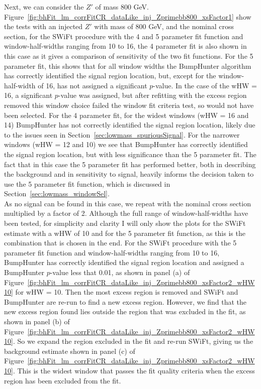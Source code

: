 Next, we can consider the $Z'$ of mass 800 GeV.
Figure~\ref{fig:bhFit_lm_corrFitCR_dataLike_inj_Zprimebb800_xsFactor1} show the tests with an injected $Z'$ with mass of 800 GeV, and the nominal cross section,
for the SWiFt procedure with the 4 and 5 parameter fit function and window-half-widths ranging from 10 to 16,
the 4 parameter fit is also shown in this case as it gives a comparison of sensitivity of the two fit functions.
For the 5 parameter fit, this shows that for all window widths the {\sc BumpHunter} algorithm has correctly identified the signal region location,
but, except for the window-half-width of 16, has not assigned a significant $p$-value.
In the case of the wHW = 16, a significant $p$-value was assigned,
but after refitting with the excess region removed this window choice failed the window fit criteria test, so would not have been selected.
For the 4 parameter fit, for the widest windows (wHW = 16 and 14) {\sc BumpHunter} has not correctly identified the signal region location,
likely due to the issues seen in Section~\ref{sec:lowmass_spuriousSignal}.
For the narrower windows (wHW = 12 and 10) we see that {\sc BumpHunter} has correctly identified the signal region location, but with less significance than the 5 parameter fit.
The fact that in this case the 5 parameter fit has performed better, both in describing the background and in sensitivity to signal,
heavily informs the decision taken to use the 5 parameter fit function, which is discussed in Section~\ref{sec:lowmass_windowSel}. \\

As no signal can be found in this case, we repeat with the nominal cross section multiplied by a factor of 2.
Although the full range of window-half-widths have been tested,
for simplicity and clarity I will only show the plots for the SWiFt estimate with a wHW of 10 and for the 5 parameter fit function,
as this is the combination that is chosen in the end.
For the SWiFt procedure with the 5 parameter fit function and window-half-widths ranging from 10 to 16,
{\sc BumpHunter} has correctly identified the signal region location and assigned a {\sc BumpHunter} $p$-value less that 0.01,
as shown in panel (a) of Figure~\ref{fig:bhFit_lm_corrFitCR_dataLike_inj_Zprimebb800_xsFactor2_wHW10} for wHW = 10.
Then the most excess region is removed and SWiFt and {\sc BumpHunter} are re-run to find a new excess region.
However, we find that the new excess region found lies outside the region that was excluded in the fit,
as shown in panel (b) of Figure~\ref{fig:bhFit_lm_corrFitCR_dataLike_inj_Zprimebb800_xsFactor2_wHW10}.
So we expand the region excluded in the fit and re-run SWiFt,
giving us the background estimate shown in panel (c) of Figure~\ref{fig:bhFit_lm_corrFitCR_dataLike_inj_Zprimebb800_xsFactor2_wHW10}.
This is the widest window that passes the fit quality criteria when the excess region has been excluded from the fit. \\

